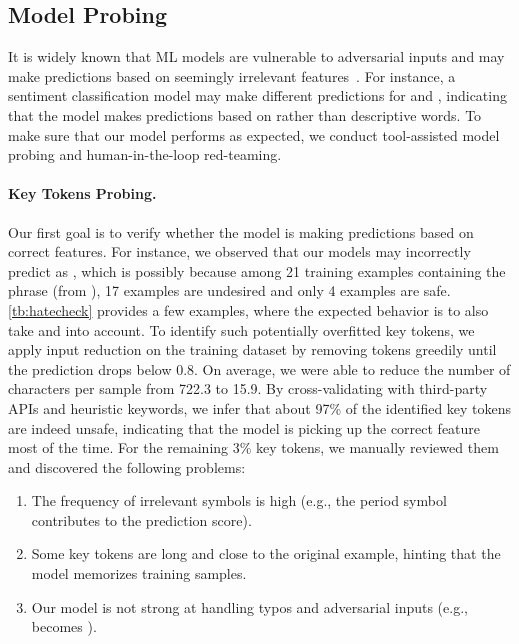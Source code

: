 \documentclass[letterpaper]{article} %
\begin{document}
\subsection{Model Probing}
\label{sec:modelprobing}

It is widely known that ML models are vulnerable to adversarial inputs and may make predictions based on seemingly irrelevant features~\citep{Szegedy2013IntriguingPO,Goodfellow2015ExplainingAH,alzantot-etal-2018-generating,zhang2021double}. For instance, a sentiment classification model may make different predictions for  and , indicating that the model makes predictions based on  rather than descriptive words.
To make sure that our model performs as expected, we conduct tool-assisted model probing and human-in-the-loop red-teaming.

\paragraph{Key Tokens Probing.} Our first goal is to verify whether the model is making predictions based on correct features. For instance, we observed that our models may incorrectly predict  as , which is possibly because among 21 training examples containing the phrase (from \citet{hatecheck}), 17 examples are undesired and only 4 examples are safe. \cref{tb:hatecheck} provides a few examples, where the expected behavior is to also take  and  into account.
To identify such potentially overfitted key tokens, we apply input reduction \citep{feng-etal-2018-pathologies} on the training dataset by removing tokens greedily until the prediction drops below 0.8. On average, we were able to reduce the number of characters per sample from 722.3 to 15.9. %
By cross-validating with third-party APIs and heuristic keywords, we infer that about 97\% of the identified key tokens are indeed unsafe, indicating that the model is picking up the correct feature most of the time. For the remaining 3\% key tokens, we manually reviewed them and discovered the following problems:
\begin{enumerate}
    \item The frequency of irrelevant symbols is high (e.g., the period symbol contributes to the prediction score).
    \item Some key tokens are long and close to the original example, hinting that the model memorizes training samples.
    \item Our model is not strong at handling typos and adversarial inputs (e.g.,  becomes ).
\end{enumerate}
\end{document}
